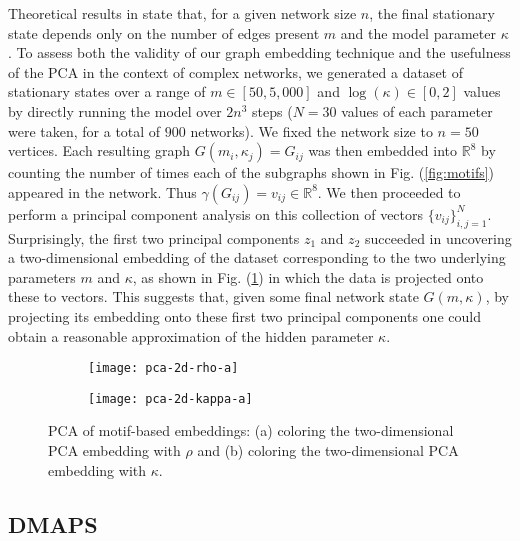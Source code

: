 \documentclass[epjST, final]{svjour}
\begin{document}
\begin{onehalfspace}
Theoretical results in \cite{rath_time_2012} state that, for a given
network size $n$, the final stationary state depends only on the
number of edges present $m$ and the model parameter $\kappa$. To
assess both the validity of our graph embedding technique and the
usefulness of the PCA in the context of complex networks, we generated
a dataset of stationary states over a range of $m \in [50, 5,000]$ and
$\log(\kappa) \in [0, 2]$ values by directly running the model over
$2n^3$ steps ($N=30$ values of each parameter were taken, for a total
of $900$ networks). We fixed the network size to $n=50$ vertices. Each
resulting graph $G(m_i, \kappa_j) = G_{ij}$ was then embedded into
$\mathbb{R}^8$ by counting the number of times each of the subgraphs
shown in Fig. (\ref{fig:motifs}) appeared in the network. Thus
$\gamma(G_{ij}) = v_{ij} \in \mathbb{R}^8$. We then proceeded to
perform a principal component analysis on this collection of vectors
$\{v_{ij}\}_{i,j=1}^N$. Surprisingly, the first two principal
components $z_1$ and $z_2$ succeeded in uncovering a two-dimensional
embedding of the dataset corresponding to the two underlying
parameters $m$ and $\kappa$, as shown in Fig. (\ref{fig:pca}) in which
the data is projected onto these to vectors. This suggests that, given
some final network state $G(m, \kappa)$, by projecting its embedding
onto these first two principal components one could obtain a
reasonable approximation of the hidden parameter $\kappa$.

\begin{figure}[h!]
  \vspace{-5mm}
  \centering
  \begin{subfigure}{0.49\textwidth}
    \centering
    \texttt{[image: pca-2d-rho-a]}
    \subcaption{\label{fig:pca-rho}}
  \end{subfigure} %
  \begin{subfigure}{0.49\textwidth}
    \centering
    \texttt{[image: pca-2d-kappa-a]}
    \subcaption{\label{fig:pca-kappa}}
  \end{subfigure}%
  \caption{PCA of motif-based embeddings: (a) coloring the
    two-dimensional PCA embedding with $\rho$ and (b) coloring the
    two-dimensional PCA embedding with $\kappa$. \label{fig:pca}}
\end{figure}

\subsection{DMAPS}


\end{onehalfspace}
\end{document}
